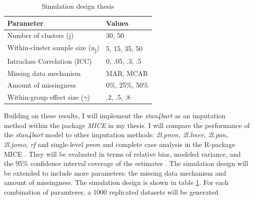 \documentclass[10pt, a4paper, titlepage]{article}
\begin{document}
\begin{table}
\centering
\caption{Simulation design thesis}
\label{tab:simulationparameters2}
\begin{tabular}{l|l}
\textbf{Parameter}                                  & \textbf{Values} \\ \hline
Number of clusters (j)                              & 30, 50          \\
Within-cluster sample size (n\textsubscript{j})     & 5, 15, 35, 50   \\
Intraclass Correlation (ICC)                        & 0, .05, .3, .5  \\
Missing data mechanism                              & MAR, MCAR       \\
Amount of missingness                               & 0\%, 25\%, 50\% \\
Within-group effect size ($\gamma$)                 & .2, .5, .8
\end{tabular}
\end{table}

Building on these results, I will implement the \textit{stan4bart} as an imputation method within the package \textit{MICE} \citep{buuren2011} in my thesis. I will compare the performance of the \textit{stan4bart} model to other imputation methods: \textit{2l.pmm, 2l.lmer, 2l.pan, 2l.jomo, rf} and single-level \textit{pmm} and complete case analysis in the R-package MICE \citep{buuren2011}. They will be evaluated in terms of relative bias, modeled variance, and the 95\% confidence interval coverage of the estimates \citep{oberman2023}. The simulation design will be extended to include more parameters: the missing data mechanism and amount of missingness. The simulation design is shown in table \ref{tab:simulationparameters2}. For each combination of paramteres, a 1000 replicated datasets will be generated.

\newpage


\end{document}
